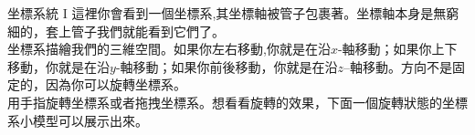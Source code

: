 \begin{surferPage}{坐標系統 I}
這裡你會看到一個坐標系,其坐標軸被管子包裹著。坐標軸本身是無窮細的，套上管子我們就能看到它們了。\\
坐標系描繪我們的三維空間。如果你左右移動,你就是在沿$x$-軸移動；如果你上下移動，你就是在沿$y$-軸移動；如果你前後移動，你就是在沿$z$--軸移動。方向不是固定的，因為你可以旋轉坐標系。\\
\vspace{0.3cm}
用手指旋轉坐標系或者拖拽坐標系。想看看旋轉的效果，下面一個旋轉狀態的坐標系小模型可以展示出來。
\end{surferPage}
